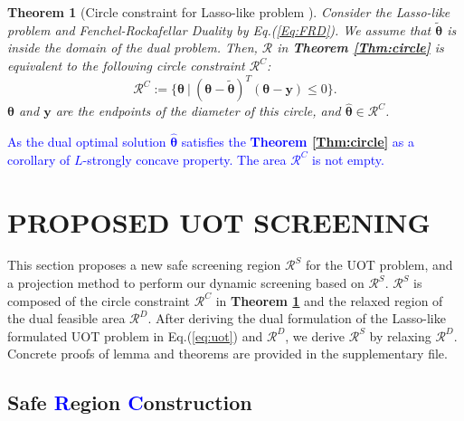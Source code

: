 \documentclass[twoside]{article}
\theoremstyle{plain}
\newtheorem{thm}{Theorem}
\renewcommand{\vec}[1]{\bm{#1}}
\newcommand{\changeXS}[1]{\textcolor{blue}{#1}}
\begin{document}
\begin{thm}[Circle constraint for Lasso-like problem {\citep[Theorem 8]{Yamada_NIPS_2021}}]
\label{Thm:CC}
Consider the Lasso-like problem and Fenchel-Rockafellar Duality by Eq.(\ref{Eq:FRD}). We assume that $\tilde{\vec{\theta}}$ is inside the domain of the dual problem. Then, $\mathcal{R}$ in {\bf Theorem \ref{Thm:circle}} is equivalent to the following circle constraint $\mathcal{R}^{C}$:
\begin{equation}
\mathcal{R}^{C} :=\{\vec\theta\ |\ (\vec{\theta}-\tilde{\vec{\theta}})^T(\vec{\theta}-\vec{y})\leq 0\}.
\label{eq:uotcircle}
\end{equation}
$\vec\theta$ and $\vec y$ are the endpoints of the diameter of this circle, and $\hat{ \vec\theta} \in \mathcal{R}^{C}$.
\end{thm}
\changeXS{As the dual optimal solution $\hat{\vec{\theta}}$ satisfies the {\bf Theorem \ref{Thm:circle}} as a corollary of $L$-strongly concave property. The area $\mathcal{R}^{C}$ is not empty. }



\section{PROPOSED UOT SCREENING}
\label{sec:pro}

This section proposes a new safe screening region $\mathcal{R}^S$ for the UOT problem, and a projection method to perform our dynamic screening based on $\mathcal{R}^S$. $\mathcal{R}^S$ is composed of the circle constraint $\mathcal{R}^C$ in {\bf Theorem \ref{Thm:CC}} and the relaxed region of the dual feasible area $\mathcal{R}^D$. After deriving the dual formulation of the Lasso-like formulated UOT problem in Eq.(\ref{eq:uot}) and $\mathcal{R}^D$, we derive $\mathcal{R}^S$ by relaxing $\mathcal{R}^D$. 
%
Concrete proofs of lemma and theorems are provided in the supplementary file.
\subsection{Safe \changeXS{R}egion \changeXS{C}onstruction}
\end{document}
